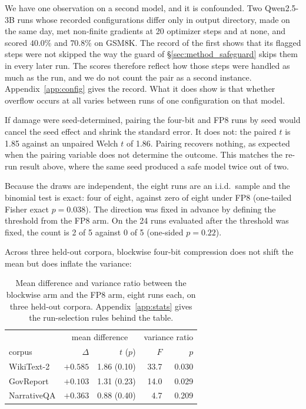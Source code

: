 \documentclass[11pt,letterpaper]{article}
\begin{document}
We have one observation on a second model, and it is confounded. Two Qwen2.5-3B runs whose recorded configurations differ only in output directory, made on the same day, met non-finite gradients at 20 optimizer steps and at none, and scored $40.0\%$ and $70.8\%$ on GSM8K. The record of the first shows that its flagged steps were not skipped the way the guard of \S\ref{sec:method_safeguard} skips them in every later run. The scores therefore reflect how those steps were handled as much as the run, and we do not count the pair as a second instance. Appendix~\ref{app:config} gives the record. What it does show is that whether overflow occurs at all varies between runs of one configuration on that model.

\medskip
If damage were seed-determined, pairing the four-bit and FP8 runs by seed would cancel the seed effect and shrink the standard error. It does not: the paired $t$ is 1.85 against an unpaired Welch $t$ of 1.86. Pairing recovers nothing, as expected when the pairing variable does not determine the outcome. This matches the re-run result above, where the same seed produced a safe model twice out of two.

Because the draws are independent, the eight runs are an i.i.d.\ sample and the binomial test is exact: four of eight, against zero of eight under FP8 (one-tailed Fisher exact $p = 0.038$). The direction was fixed in advance by defining the threshold from the FP8 arm. On the 24 runs evaluated after the threshold was fixed, the count is 2 of 5 against 0 of 5 (one-sided $p = 0.22$).

\medskip
Across three held-out corpora, blockwise four-bit compression does not shift the mean but does inflate the variance:

\begin{table}[htbp]
\centering
\small
\caption{Mean difference and variance ratio between the blockwise arm and the FP8 arm, eight runs each, on three held-out corpora. Appendix~\ref{app:stats} gives the run-selection rules behind the table.}
\label{tab:threecorpora}
\begin{tabular}{lrrrr}
\toprule
& \multicolumn{2}{c}{mean difference} & \multicolumn{2}{c}{variance ratio} \\
corpus & $\Delta$ & $t$ ($p$) & $F$ & $p$ \\
\midrule
WikiText-2   & $+0.585$ & 1.86 (0.10) & 33.7 & 0.030 \\
GovReport    & $+0.103$ & 1.31 (0.23) & 14.0 & 0.029 \\
NarrativeQA  & $+0.363$ & 0.88 (0.40) &  4.7 & 0.209 \\
\bottomrule
\end{tabular}
\end{table}
\end{document}
